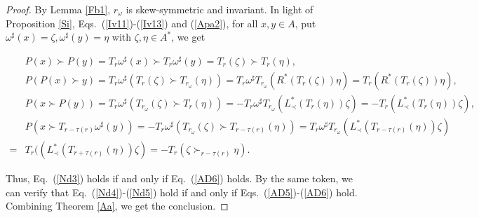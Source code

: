\documentclass[12pt]{amsart}
\theoremstyle{definition}
\begin{document}
\begin{proof} By Lemma \ref{Fb1}, $r_{\omega}$ is skew-symmetric and invariant. In light of Proposition \ref{Si},
 Eqs.~(\ref{Iv11})-(\ref{Iv13}) and (\ref{Apa2}),
 for all $x,y\in A$, put $\omega^{\sharp}(x)=\zeta,\omega^{\sharp}(y)=\eta$ with 
$\zeta,\eta\in A^{*}$, we get
\begin{small}
\begin{align*}& P(x)\succ P(y)=T_{r}\omega^{\sharp}(x)\succ T_{r}\omega^{\sharp}(y)=T_{r}(\zeta)\succ T_{r}(\eta),\\
&P(P(x)\succ y)=T_{r}\omega^{\sharp}(T_{r}(\zeta)\succ T_{r_{\omega}}(\eta))=
T_{r}\omega^{\sharp} T_{r_{\omega}}(R_{\cdot}^{*}(T_{r}(\zeta))\eta)
=T_{r}(R_{\cdot}^{*}(T_{r}(\zeta))\eta),
\\
&P(x\succ P(y))=T_{r}\omega^{\sharp}(T_{r_{\omega}}(\zeta)\succ T_{r}(\eta))=-
T_{r}\omega^{\sharp}T_{r_{\omega}}(L_{\prec}^{*}(T_{r}(\eta))\zeta)
=-T_{r}(L_{\prec}^{*}(T_{r}(\eta))\zeta),
\\
&P(x\succ T_{r-\tau(r)}\omega^{\sharp}(y))
=-T_{r}\omega^{\sharp}(T_{r_{\omega}}(\zeta)\succ T_{r-\tau(r)}(\eta))
=T_{r}\omega^{\sharp}  T_{r_{\omega}}( L_{\prec}^{*}(T_{r-\tau(r)}(\eta))\zeta)
\\=&T_{r}(( L_{\prec}^{*}(T_{r+\tau(r)}(\eta))\zeta)
=-T_{r}(\zeta\succ_{r-\tau(r)}\eta).\end{align*}\end{small}
 Thus, Eq.~(\ref{Nd3}) holds if and only if Eq.~(\ref{AD6}) holds.
By the same token, we can verify that Eq.~(\ref{Nd4})-(\ref{Nd5}) hold if and only if Eqs.~(\ref{AD5})-(\ref{AD6}) hold. 
Combining Theorem \ref{Aa}, we get the conclusion.

 \end{proof}
 
\end{document}
